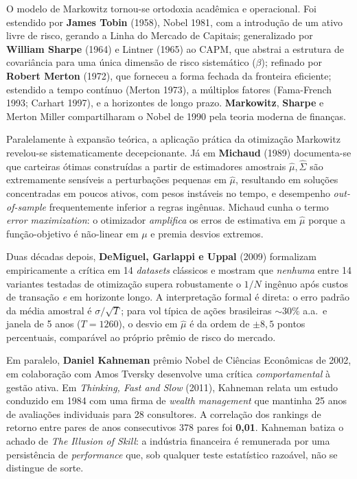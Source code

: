 \documentclass[12pt,a4paper,oneside]{article}
\begin{document}
O modelo de Markowitz tornou-se ortodoxia acadêmica e operacional.
Foi estendido por \textbf{James Tobin} (1958), Nobel 1981, com a
introdução de um ativo livre de risco, gerando a Linha do Mercado de
Capitais; generalizado por \textbf{William Sharpe} (1964) e Lintner
(1965) ao CAPM, que abstrai a estrutura de covariância para uma
única dimensão de risco sistemático ($\beta$); refinado por
\textbf{Robert Merton} (1972), que forneceu a forma fechada da
fronteira eficiente; estendido a tempo contínuo (Merton 1973), a
múltiplos fatores (Fama-French 1993; Carhart 1997), e a horizontes
de longo prazo. \textbf{Markowitz}, \textbf{Sharpe} e Merton Miller
compartilharam o Nobel de 1990 pela teoria moderna de finanças.

Paralelamente à expansão teórica, a aplicação prática da otimização
Markowitz revelou-se sistematicamente decepcionante. Já em
\textbf{Michaud} (1989) documenta-se que carteiras ótimas construídas
a partir de estimadores amostrais $\hat{\mu}, \hat{\Sigma}$ são
extremamente sensíveis a perturbações pequenas em $\hat{\mu}$,
resultando em soluções concentradas em poucos ativos, com pesos
instáveis no tempo, e desempenho \textit{out-of-sample}
frequentemente inferior a regras ingênuas. Michaud cunha o termo
\textit{error maximization}: o otimizador \emph{amplifica} os erros
de estimativa em $\hat{\mu}$ porque a função-objetivo é não-linear em
$\mu$ e premia desvios extremos.

Duas décadas depois, \textbf{DeMiguel, Garlappi e Uppal} (2009)
formalizam empiricamente a crítica em 14 \textit{datasets} clássicos
e mostram que \textit{nenhuma} entre 14 variantes testadas de
otimização supera robustamente o $1/N$ ingênuo após custos de
transação \textit{e} em horizonte longo. A interpretação formal é
direta: o erro padrão da média amostral é $\sigma/\sqrt{T}$; para vol
típica de ações brasileiras $\sim 30\%$ a.a.\ e janela de 5 anos
($T = 1260$), o desvio em $\hat{\mu}$ é da ordem de $\pm 8{,}5$
pontos percentuais, comparável ao próprio prêmio de risco do mercado.

Em paralelo, \textbf{Daniel Kahneman} \textemdash{} prêmio Nobel de
Ciências Econômicas de 2002, em colaboração com Amos Tversky
\textemdash{} desenvolve uma crítica \textit{comportamental} à
gestão ativa. Em \textit{Thinking, Fast and Slow} (2011), Kahneman
relata um estudo conduzido em 1984 com uma firma de \textit{wealth
management} que mantinha 25 anos de avaliações individuais para 28
consultores. A correlação dos rankings de retorno entre pares de
anos consecutivos \textemdash{} 378 pares \textemdash{} foi
\textbf{0{,}01}. Kahneman batiza o achado de \textit{The Illusion of
Skill}: a indústria financeira é remunerada por uma persistência de
\textit{performance} que, sob qualquer teste estatístico razoável,
não se distingue de sorte.
\end{document}

